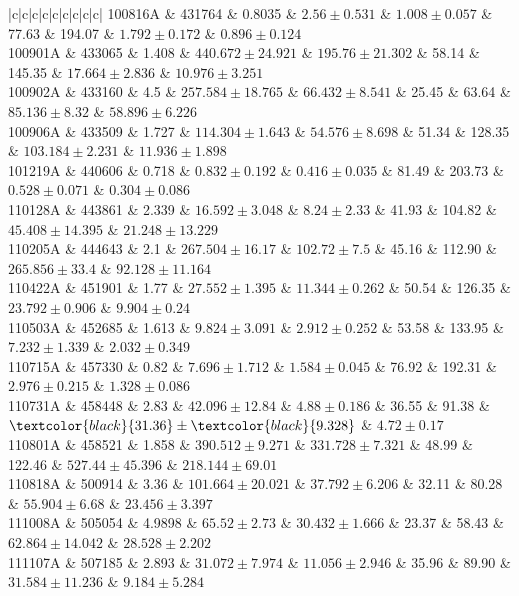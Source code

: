 \documentclass[prd,nofootinbib,preprintnumbers,floatfix]{revtex4}  %
\newcommand{\rthis}[1]{\textcolor{black}{#1}}
\begin{document}
\begin{center}
\begin{longtable*}{|c|c|c|c|c|c|c|c|c|}
100816A	&	431764	&	0.8035	&	$	2.56	\pm	0.531	$	&	$	1.008	\pm	0.057	$	&	77.63	&	194.07	&	$	1.792	\pm	0.172	$	&	$	0.896	\pm	0.124	$	\\
100901A	&	433065	&	1.408	&	$	440.672	\pm	24.921	$	&	$	195.76	\pm	21.302	$	&	58.14	&	145.35	&	$	17.664	\pm	2.836	$	&	$	10.976	\pm	3.251	$	\\
100902A	&	433160	&	4.5	&	$	257.584	\pm	18.765	$	&	$	66.432	\pm	8.541	$	&	25.45	&	63.64	&	$	85.136	\pm	8.32	$	&	$	58.896	\pm	6.226	$	\\
100906A	&	433509	&	1.727	&	$	114.304	\pm	1.643	$	&	$	54.576	\pm	8.698	$	&	51.34	&	128.35	&	$	103.184	\pm	2.231	$	&	$	11.936	\pm	1.898	$	\\
101219A	&	440606	&	0.718	&	$	0.832	\pm	0.192	$	&	$	0.416	\pm	0.035	$	&	81.49	&	203.73	&	$	0.528	\pm	0.071	$	&	$	0.304	\pm	0.086	$	\\
110128A	&	443861	&	2.339	&	$	16.592	\pm	3.048	$	&	$	8.24	\pm	2.33	$	&	41.93	&	104.82	&	$	45.408	\pm	14.395	$	&	$	21.248	\pm	13.229	$	\\
110205A	&	444643	&	2.1	&	$	267.504	\pm	16.17	$	&	$	102.72	\pm	7.5	$	&	45.16	&	112.90	&	$	265.856	\pm	33.4	$	&	$	92.128	\pm	11.164	$	\\
110422A	&	451901	&	1.77	&	$	27.552	\pm	1.395	$	&	$	11.344	\pm	0.262	$	&	50.54	&	126.35	&	$	23.792	\pm	0.906	$	&	$	9.904	\pm	0.24	$	\\
110503A	&	452685	&	1.613	&	$	9.824	\pm	3.091	$	&	$	2.912	\pm	0.252	$	&	53.58	&	133.95	&	$	7.232	\pm	1.339	$	&	$	2.032	\pm	0.349	$	\\
110715A	&	457330	&	0.82	&	$	7.696	\pm	1.712	$	&	$	1.584	\pm	0.045	$	&	76.92	&	192.31	&	$	2.976	\pm	0.215	$	&	$	1.328	\pm	0.086	$	\\
110731A	&	458448	&	2.83	&	$	42.096	\pm	12.84	$	&	$	4.88	\pm	0.186	$	&	36.55	&	91.38	&	$	\rthis{31.36}	\pm	\rthis{9.328}	$	&	$	4.72	\pm	0.17	$	\\
110801A	&	458521	&	1.858	&	$	390.512	\pm	9.271	$	&	$	331.728	\pm	7.321	$	&	48.99	&	122.46	&	$	527.44	\pm	45.396	$	&	$	218.144	\pm	69.01	$	\\
110818A	&	500914	&	3.36	&	$	101.664	\pm	20.021	$	&	$	37.792	\pm	6.206	$	&	32.11	&	80.28	&	$	55.904	\pm	6.68	$	&	$	23.456	\pm	3.397	$	\\
111008A	&	505054	&	4.9898	&	$	65.52	\pm	2.73	$	&	$	30.432	\pm	1.666	$	&	23.37	&	58.43	&	$	62.864	\pm	14.042	$	&	$	28.528	\pm	2.202	$	\\
111107A	&	507185	&	2.893	&	$	31.072	\pm	7.974	$	&	$	11.056	\pm	2.946	$	&	35.96	&	89.90	&	$	31.584	\pm	11.236	$	&	$	9.184	\pm	5.284	$	\\

\end{longtable*}
\end{center}
\end{document}
